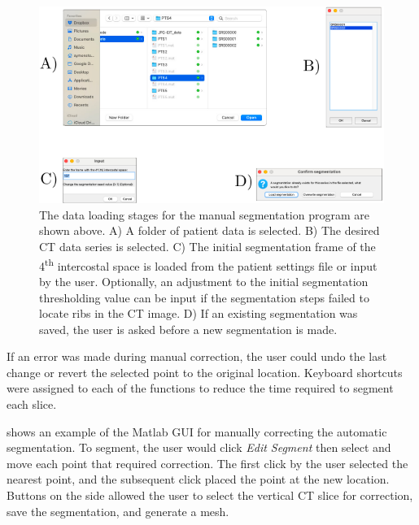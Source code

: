 \begin{figure}[H]
	\centering
	\includegraphics[width=\textwidth]{chapter5-CT_to_mesh/imgs/SegmentationAppSetup.pdf}
	\caption[Manual segmentation data loading]{\label{fig:seg_load}%
	The data loading stages for the manual segmentation program are shown above.
	A) A folder of patient data is selected. B) The desired CT data series is selected.
	C) The initial segmentation frame of the 4\textsuperscript{th} intercostal space 
	is loaded from the patient settings file or input by the user. Optionally, an 
	adjustment to the initial segmentation thresholding value can be input if the 
	segmentation steps failed to locate ribs in the CT image. D) If an existing
	segmentation was saved, the user is asked before a new segmentation 
	is made.
	}
\end{figure}

If an error was made during manual correction, the user could undo
the last change or revert the selected point to the original location. 
Keyboard shortcuts were assigned to each of the functions to reduce the time required
to segment each slice.

 shows an example of the Matlab GUI for manually correcting
the automatic segmentation. To segment, the user would click \emph{Edit Segment} 
then select and move each point that required correction. The first click by the user
selected the nearest point, and the subsequent click placed the point at the new location. 
Buttons on the side allowed the user to 
select the vertical CT slice for correction, save the segmentation, and generate a mesh. 

